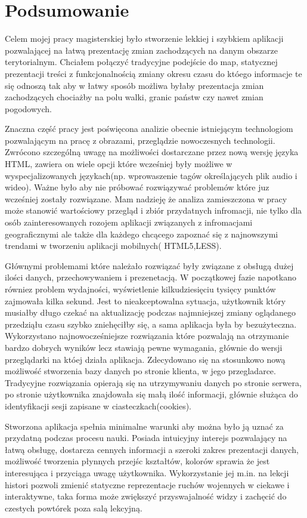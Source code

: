\chapter{Podsumowanie}

Celem mojej pracy magisterskiej było stworzenie lekkiej i szybkiem aplikacji pozwalającej na łatwą prezentację zmian zachodzących na danym obszarze terytorialnym. Chciałem połączyć tradycyjne podejście do map, statycznej prezentacji treści z funkcjonalnością zmiany okresu czasu do któego informacje te się odnoszą tak aby w łatwy sposób możliwa byłaby prezentacja zmian zachodzących chociażby na polu walki, granic państw czy nawet zmian pogodowych.

Znaczna część pracy jest poświęcona analizie obecnie istniejącym technologiom pozwalającym na pracę z obrazami, przeglądzie nowoczesnych technologii. Zwrócono szczególną uwagę na możliwości dostarczane przez nową wersję języka HTML, zawiera on wiele opcji które wcześniej były możliwe w wyspecjalizowanych językach(np. wprowaszenie tagów określających plik audio i wideo). Ważne było aby nie próbować rozwiązywać problemów które juz wcześniej zostały rozwiązane. Mam nadzieję że analiza zamieszczona w pracy może stanowić wartościowy przegląd i zbiór przydatnych infromacji, nie tylko dla osób zainteresowanych rozojem aplikacji związanych z infromacjami geograficznymi ale także dla każdego chcącego zapoznać się z najnowszymi trendami w tworzeniu aplikacji mobilnych( HTML5,LESS).

Głównymi problemami które należało rozwiązać były związane z obsługą dużej ilości danych, przechowywaniem i prezenetacją. W początkowej fazie napotkano równiez problem wydajności, wyświetlenie kilkudziesięciu tysięcy punktów zajmowała kilka sekund. Jest to nieakceptowalna sytuacja, użytkownik który musiałby długo czekać na aktualizację podczas najmniejszej zmiany oglądanego przedziąłu czasu szybko zniehęciłby się, a sama aplikacja była by bezużyteczna. Wykorzystano najnowocześniejsze rozwiązania które pozwalają na otrzymanie bardzo dobrych wyników lecz stawiają pewne wymagania, głównie do wersji przeglądarki na któej działa aplikacja. Zdecydowano się na stosunkowo nową możliwość stworzenia bazy danych po stronie klienta, w jego przegladarce. Tradycyjne rozwiązania opierają się na utrzymywaniu danych po stronie serwera, po stronie użytkownika znajdowała się małą ilość informacji, głównie służąca do identyfikacji sesji zapisane w ciasteczkach(cookies).

Stworzona aplikacja spełnia minimalne warunki aby można było ją uznać za przydatną podczas procesu nauki. Posiada intuicyjny interejs pozwalający na łatwą obsługę, dostarcza cennych informacji a szeroki zakres prezentacji danych, możliwość tworzenia płynnych przejśc kształtów, kolorów sprawia że jest interesująca i przyciąga uwagę użytkownika. Wykorzystanie jej m.in. na lekcji histori pozwoli zmienić statyczne reprezentacje ruchów wojennych w ciekawe i interaktywne, taka forma może zwiększyć przyswajalność widzy i zachęcić do czestych powtórek poza salą lekcyjną.

